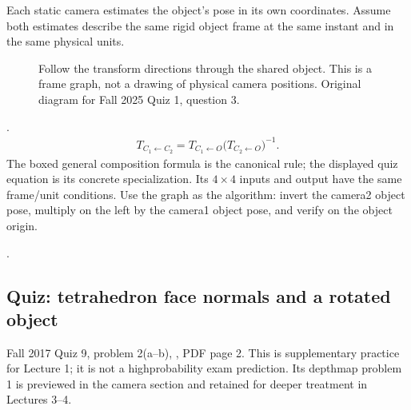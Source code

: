 \documentclass[letterpaper,11pt,english,openany,oneside]{jupyterBook}
\begin{document}
\sphinxAtStartPar
Each static camera estimates the object’s pose in its own coordinates. Assume both estimates describe the same rigid object frame at the same instant and in the same physical units.

\begin{figure}[H]
\centering
\capstart

\noindent{}
\caption{Follow the transform directions through the shared object. This is a frame graph, not a drawing of physical camera positions. Original diagram for Fall 2025 Quiz 1, question 3.}\label{\detokenize{lectures/lecture01/frames-quizzes:fig-lec01-shared-object}}\end{figure}

\sphinxAtStartPar
{} {\hyperref[\detokenize{lectures/lecture01/quiz-workbook:quiz-17-q3}]{}}.
\begin{equation}\label{equation:lectures/lecture01/frames-quizzes:eq-lec01-relative-pose}
\begin{split}T_{C_1\leftarrow C_2}=T_{C_1\leftarrow O}\bigl(T_{C_2\leftarrow O}\bigr)^{-1}.\end{split}
\end{equation}
\sphinxAtStartPar
The boxed general composition formula is the canonical rule; the displayed quiz equation is its concrete specialization. Its \(4\times4\) inputs and output have the same frame/unit conditions. Use the graph as the algorithm: invert the camera\sphinxhyphen{}2 object pose, multiply on the left by the camera\sphinxhyphen{}1 object pose, and verify on the object origin.

\sphinxAtStartPar
{} {\hyperref[\detokenize{lectures/lecture01/quiz-workbook:quiz-17-q4}]{}}.


\subsection{Quiz: tetrahedron face normals and a rotated object}
\label{\detokenize{lectures/lecture01/frames-quizzes:quiz-tetrahedron-face-normals-and-a-rotated-object}}
\sphinxAtStartPar
{} Fall 2017 Quiz 9, problem 2(a–b), , PDF page 2. This is supplementary practice for Lecture 1; it is not a high\sphinxhyphen{}probability exam prediction. Its depth\sphinxhyphen{}map problem 1 is previewed in the camera section and retained for deeper treatment in Lectures 3–4.
\end{document}
